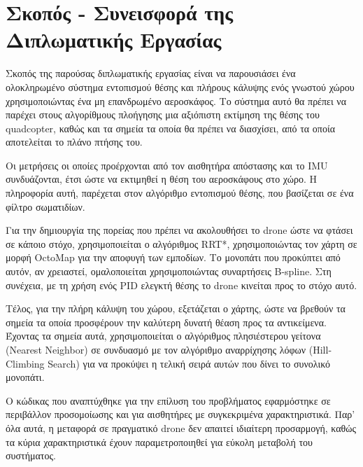\section{Σκοπός - Συνεισφορά της Διπλωματικής Εργασίας}
\label{section:contribution}

Σκοπός της παρούσας διπλωματικής εργασίας είναι να παρουσιάσει ένα ολοκληρωμένο σύστημα εντοπισμού θέσης και πλήρους κάλυψης ενός γνωστού χώρου χρησιμοποιώντας ένα μη επανδρωμένο αεροσκάφος. Το σύστημα αυτό θα πρέπει να παρέχει στους αλγορίθμους πλοήγησης μια αξιόπιστη εκτίμηση της θέσης του quadcopter, καθώς και τα σημεία τα οποία θα πρέπει να διασχίσει, από τα οποία αποτελείται το πλάνο πτήσης του.

Οι μετρήσεις οι οποίες προέρχονται από τον αισθητήρα απόστασης και το IMU συνδυάζονται, έτσι ώστε να εκτιμηθεί η θέση του αεροσκάφους στο χώρο. Η πληροφορία αυτή, παρέχεται στον αλγόριθμο εντοπισμού θέσης, που βασίζεται σε ένα φίλτρο σωματιδίων.

Για την δημιουργία της πορείας που πρέπει να ακολουθήσει το drone ώστε να φτάσει σε κάποιο στόχο, χρησιμοποιείται ο αλγόριθμος RRT*, χρησιμοποιώντας τον χάρτη σε μορφή OctoMap για την αποφυγή των εμποδίων. Το μονοπάτι που προκύπτει από αυτόν, αν χρειαστεί, ομαλοποιείται χρησιμοποιώντας συναρτήσεις B-spline. Στη συνέχεια, με τη χρήση ενός PID ελεγκτή θέσης το drone κινείται προς το στόχο αυτό.

Τέλος, για την πλήρη κάλυψη του χώρου, εξετάζεται ο χάρτης, ώστε να βρεθούν τα σημεία τα οποία προσφέρουν την καλύτερη δυνατή θέαση προς τα αντικείμενα. Έχοντας τα σημεία αυτά, χρησιμοποιείται ο αλγόριθμος πλησιέστερου γείτονα (Nearest Neighbor) σε συνδυασμό με τον αλγόριθμο αναρρίχησης λόφων (Hill-Climbing Search) για να προκύψει η τελική σειρά αυτών που δίνει το συνολικό μονοπάτι.

Ο κώδικας που αναπτύχθηκε για την επίλυση του προβλήματος εφαρμόστηκε σε περιβάλλον προσομοίωσης και για αισθητήρες με συγκεκριμένα χαρακτηριστικά. Παρ' όλα αυτά, η μεταφορά σε πραγματικό drone δεν απαιτεί ιδιαίτερη προσαρμογή, καθώς τα κύρια χαρακτηριστικά έχουν παραμετροποιηθεί για εύκολη μεταβολή του συστήματος.